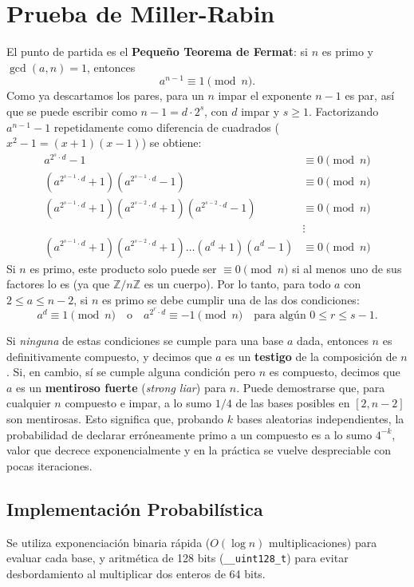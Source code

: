 \documentclass[11pt,a4paper]{article}
\begin{document}
\section*{Prueba de Miller-Rabin}
El punto de partida es el \textbf{Pequeño Teorema de Fermat}: si $n$ es primo y $\gcd(a,n)=1$, entonces
$$a^{n-1} \equiv 1 \pmod{n}.$$
Como ya descartamos los pares, para un $n$ impar el exponente $n-1$ es par, así que se puede escribir como $n-1 = d \cdot 2^s$, con $d$ impar y $s \geq 1$. Factorizando $a^{n-1}-1$ repetidamente como diferencia de cuadrados ($x^2-1=(x+1)(x-1)$) se obtiene:
\begin{align*}
a^{2^s\cdot d} - 1 &\equiv 0 \pmod{n} \\
(a^{2^{s-1}\cdot d} + 1)(a^{2^{s-1}\cdot d} - 1) &\equiv 0 \pmod{n} \\
(a^{2^{s-1}\cdot d} + 1)(a^{2^{s-2}\cdot d} + 1)(a^{2^{s-2}\cdot d} - 1) &\equiv 0 \pmod{n} \\
&\vdots \\
(a^{2^{s-1}\cdot d} + 1)(a^{2^{s-2}\cdot d} + 1)\dots(a^{d} + 1)(a^{d} - 1) &\equiv 0 \pmod{n}
\end{align*}
Si $n$ es primo, este producto solo puede ser $\equiv 0 \pmod n$ si al menos uno de sus factores lo es (ya que $\mathbb{Z}/n\mathbb{Z}$ es un cuerpo). Por lo tanto, para todo $a$ con $2 \leq a \leq n-2$, si $n$ es primo se debe cumplir una de las dos condiciones:
$$a^d \equiv 1 \pmod{n} \quad \text{o} \quad a^{2^r\cdot d} \equiv -1 \pmod{n} \quad \text{para algún } 0 \leq r \leq s-1.$$

Si \emph{ninguna} de estas condiciones se cumple para una base $a$ dada, entonces $n$ es definitivamente compuesto, y decimos que $a$ es un \textbf{testigo} de la composición de $n$. Si, en cambio, sí se cumple alguna condición pero $n$ es compuesto, decimos que $a$ es un \textbf{mentiroso fuerte} (\emph{strong liar}) para $n$. Puede demostrarse que, para cualquier $n$ compuesto e impar, a lo sumo $1/4$ de las bases posibles en $[2, n-2]$ son mentirosas. Esto significa que, probando $k$ bases aleatorias independientes, la probabilidad de declarar erróneamente primo a un compuesto es a lo sumo $4^{-k}$, valor que decrece exponencialmente y en la práctica se vuelve despreciable con pocas iteraciones.

\subsection*{Implementación Probabilística}
Se utiliza exponenciación binaria rápida ($O(\log n)$ multiplicaciones) para evaluar cada base, y aritmética de 128 bits (\texttt{\_\_uint128\_t}) para evitar desbordamiento al multiplicar dos enteros de 64 bits.
\end{document}
